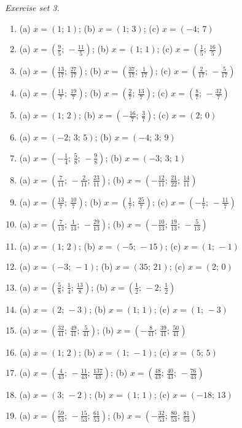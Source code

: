 \par\noindent\emph{Exercise set 3.}\nopagebreak
\begin{enumerate}[label=\arabic*., leftmargin=*, itemsep=1pt]
\item (a) $x=(1;\,1)$; (b) $x=(1;\,3)$; (c) $x=(-4;\,7)$
\item (a) $x=(\frac{9}{5};\,-\frac{11}{5})$; (b) $x=(1;\,1)$; (c) $x=(\frac{1}{5};\,\frac{16}{5})$
\item (a) $x=(\frac{13}{17};\,\frac{27}{17})$; (b) $x=(\frac{37}{17};\,\frac{1}{17})$; (c) $x=(\frac{2}{17};\,-\frac{5}{17})$
\item (a) $x=(\frac{11}{7};\,\frac{19}{7})$; (b) $x=(\frac{2}{7};\,\frac{13}{7})$; (c) $x=(\frac{8}{7};\,-\frac{32}{7})$
\item (a) $x=(1;\,2)$; (b) $x=(-\frac{16}{7};\,\frac{3}{7})$; (c) $x=(2;\,0)$
\item (a) $x=(-2;\,3;\,5)$; (b) $x=(-4;\,3;\,9)$
\item (a) $x=(-\frac{1}{4};\,\frac{5}{8};\,-\frac{9}{8})$; (b) $x=(-3;\,3;\,1)$
\item (a) $x=(\frac{7}{11};\,-\frac{2}{11};\,\frac{23}{11})$; (b) $x=(-\frac{12}{11};\,\frac{21}{22};\,\frac{14}{11})$
\item (a) $x=(\frac{13}{7};\,\frac{10}{7})$; (b) $x=(\frac{1}{7};\,\frac{25}{7})$; (c) $x=(-\frac{1}{7};\,-\frac{11}{7})$
\item (a) $x=(\frac{7}{13};\,\frac{1}{13};\,-\frac{29}{13})$; (b) $x=(-\frac{10}{13};\,\frac{19}{13};\,-\frac{5}{13})$
\item (a) $x=(1;\,2)$; (b) $x=(-5;\,-15)$; (c) $x=(1;\,-1)$
\item (a) $x=(-3;\,-1)$; (b) $x=(35;\,21)$; (c) $x=(2;\,0)$
\item (a) $x=(\frac{5}{8};\,\frac{1}{4};\,\frac{13}{8})$; (b) $x=(\frac{1}{2};\,-2;\,\frac{1}{2})$
\item (a) $x=(2;\,-3)$; (b) $x=(1;\,1)$; (c) $x=(1;\,-3)$
\item (a) $x=(\frac{32}{41};\,\frac{49}{41};\,\frac{5}{41})$; (b) $x=(-\frac{8}{41};\,\frac{39}{41};\,\frac{50}{41})$
\item (a) $x=(1;\,2)$; (b) $x=(1;\,-1)$; (c) $x=(5;\,5)$
\item (a) $x=(\frac{4}{43};\,-\frac{11}{43};\,\frac{137}{43})$; (b) $x=(\frac{48}{43};\,\frac{40}{43};\,-\frac{76}{43})$
\item (a) $x=(3;\,-2)$; (b) $x=(1;\,1)$; (c) $x=(-18;\,13)$
\item (a) $x=(\frac{59}{53};\,-\frac{15}{53};\,\frac{61}{53})$; (b) $x=(-\frac{32}{53};\,\frac{80}{53};\,\frac{81}{53})$

\end{enumerate}
